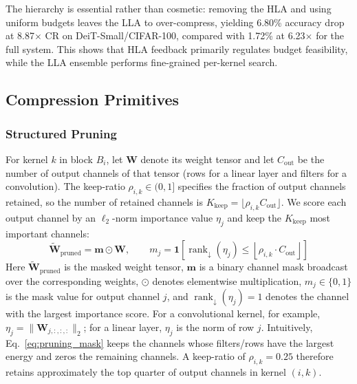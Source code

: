 \documentclass[preprint,12pt,authoryear]{elsarticle}
\begin{document}
The hierarchy is essential rather than cosmetic: removing the HLA and using uniform
budgets leaves the LLA to over-compress, yielding 6.80\% accuracy drop at 8.87$\times$
CR on DeiT-Small/CIFAR-100, compared with 1.72\% at 6.23$\times$ for the full system.
This shows that HLA feedback primarily regulates budget feasibility, while the LLA
ensemble performs fine-grained per-kernel search.

\subsection{Compression Primitives}
\label{sec:compression_primitives}

\subsubsection{Structured Pruning}

For kernel $k$ in block $B_i$, let $\mathbf{W}$ denote its weight tensor and let
$C_{\mathrm{out}}$ be the number of output channels of that tensor (rows for a linear
layer and filters for a convolution). The keep-ratio $\rho_{i,k}\in(0,1]$ specifies the
fraction of output channels retained, so the number of retained channels is
$K_{\mathrm{keep}}=\lfloor\rho_{i,k}C_{\mathrm{out}}\rfloor$. We score each output
channel by an $\ell_2$-norm importance value $\eta_j$ and keep the
$K_{\mathrm{keep}}$ most important channels:
\begin{equation}
    \widetilde{\mathbf{W}}_{\mathrm{pruned}} = \mathbf{m} \odot \mathbf{W},
    \qquad
    m_j = \mathbf{1}\!\left[
        \operatorname{rank}_{\downarrow}(\eta_j) \leq
        \left\lfloor \rho_{i,k} \cdot C_{\mathrm{out}} \right\rfloor
    \right]
    \label{eq:pruning_mask}
\end{equation}
\noindent Here $\widetilde{\mathbf{W}}_{\mathrm{pruned}}$ is the masked weight tensor,
$\mathbf{m}$ is a binary channel mask broadcast over the corresponding weights,
$\odot$ denotes elementwise multiplication, $m_j\in\{0,1\}$ is the mask value for output
channel $j$, and $\operatorname{rank}_{\downarrow}(\eta_j)=1$ denotes the channel with
the largest importance score. For a convolutional kernel, for example,
$\eta_j=\|\mathbf{W}_{j,:,:,:}\|_2$; for a linear layer, $\eta_j$ is the norm of row
$j$. Intuitively, Eq.~\eqref{eq:pruning_mask} keeps the channels whose filters/rows have
the largest energy and zeros the remaining channels. A keep-ratio of $\rho_{i,k}=0.25$
therefore retains approximately the top quarter of output channels in kernel $(i,k)$.
\end{document}
